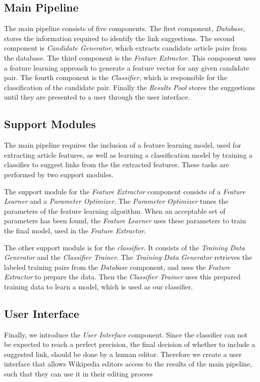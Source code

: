 
\subsection{Main Pipeline}
 The main pipeline consists of five components. The first component, \emph{Database}, stores the information required to identify the link suggestions. The second component is \emph{Candidate Generator}, which extracts candidate article pairs from the database. The third component is the \emph{Feature Extractor}. This component uses a feature learning approach to generate a feature vector for any given candidate pair. The fourth component is the \emph{Classifier}, which is responsible for the classification of the candidate pair. Finally the \emph{Results Pool} stores the suggestions until they are presented to a user through the user interface.

\subsection{Support Modules}
The main pipeline requires the inclusion of a feature learning model, used for extracting article features, as well as learning a classification model by training a classifier to suggest links from the the extracted features. These tasks are performed by two support modules.

The support module for the \emph{Feature Extractor} component consists of a \emph{Feature Learner} and a \emph{Parameter Optimizer}. The \emph{Parameter Optimizer} tunes the parameters of the feature learning algorithm. When an acceptable set of parameters has been found, the \emph{Feature Learner} uses these parameters to train the final model, used in the \emph{Feature Extractor}.

The other support module is for the \emph{classifier}. It consists of the \emph{Training Data Generator} and the \emph{Classifier Trainer}. The \emph{Training Data Generator} retrieves the labeled training pairs from the \emph{Database} component, and uses the \emph{Feature Extractor} to prepare the data. Then the \emph{Classifier Trainer} uses this prepared training data to learn a model, which is used as our classifier.

\subsection{User Interface}
Finally, we introduce the \emph{User Interface} component. Since the classifier can not be expected to reach a perfect precision, the final decision of whether to include a suggested link, should be done by a human editor. Therefore we create a user interface that allows Wikipedia editors access to the results of the main pipeline, such that they can use it in their editing process

